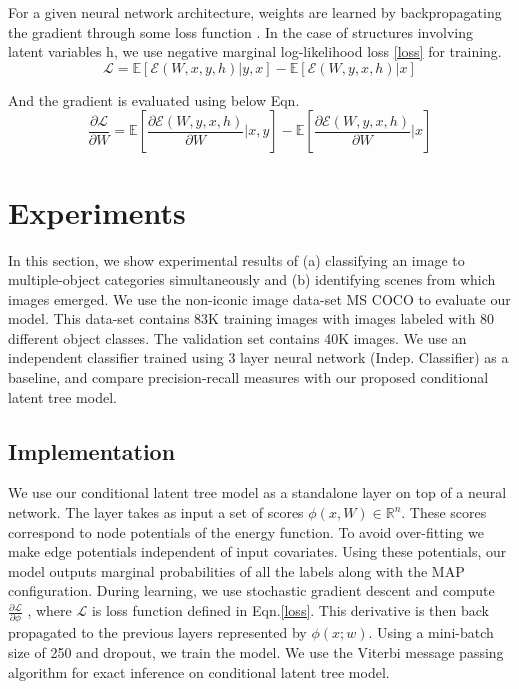 \documentclass{article}
\begin{document}
For a given neural network architecture, weights are learned by backpropagating the gradient through some loss function \cite{lossfunctions}. In the case of structures involving  latent variables h, we use negative marginal log-likelihood loss \eqref{loss} for training.
\begin{equation}
 \mathcal{L}=\mathbb{E}\left[\mathcal{E}(W,x,y,h)|y,x \right] - \mathbb{E}\left[\mathcal{E}(W,y,x,h)|x\right]
\label{loss}
\end{equation}

And the gradient is evaluated using below Eqn.
\begin{equation*}
\frac { \partial  \mathcal{L}} { \partial W }  = \mathbb{E}\left[ \frac { \partial  \mathcal{E}(W,y,x,h) }{ \partial W } |x,y \right] -  \mathbb{E}\left[ \frac { \partial \mathcal{E}(W,y,x,h) }{ \partial W } |x \right]
\end{equation*}


\section{Experiments}\label{sec:5}




In this section, we show experimental results of (a) classifying an image to multiple-object categories simultaneously and (b) identifying scenes from which images emerged. We use the non-iconic image data-set MS COCO \cite{MSCOCO} to evaluate our model. This data-set contains 83K training images with images labeled with 80 different object classes. The validation set contains 40K images. We use an independent classifier trained using 3 layer neural network (Indep. Classifier)  as a baseline, and compare precision-recall measures with our proposed conditional latent tree model.



\subsection*{Implementation}
We use our conditional latent tree model as a standalone layer on top of a neural network.
The layer takes as input a set of scores $\phi(x,W) \in \mathbb{R}^{n}$. These scores correspond to node potentials of the energy function. To avoid over-fitting we make edge potentials independent of input covariates. Using these potentials, our model outputs marginal probabilities of all the labels along with the MAP configuration. During learning, we use stochastic gradient descent and compute $ \frac{\partial  \mathcal{L}}{\partial \phi}$ , where $ \mathcal{L}$ is loss function defined in Eqn.\eqref{loss}. This derivative is then back propagated to the previous layers represented by $\phi(x;w)$. Using a mini-batch size of 250 and dropout, we train the model. We use the Viterbi message passing algorithm for exact inference on conditional latent tree model.
\end{document}
